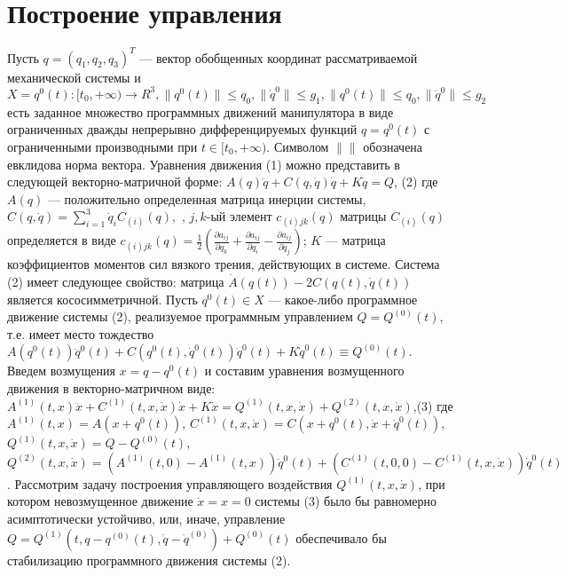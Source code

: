  \section{Построение управления}%
 \label{sec2.3}
 Пусть  $q = (q_1, q_2, q_3)^T$ --- вектор обобщенных координат рассматриваемой механической системы и $X = {q^0(t):[t_0, + \infty) \to R^3, \| q^0(t) \| \le q_0, \| \dot q^0 \| \le g_1,\| q^0(t) \| \le q_0, \| \ddot q^0 \| \le g_2}$ есть заданное множество программных движений манипулятора в виде ограниченных дважды непрерывно дифференцируемых функций $q = q^0(t)$ с ограниченными производными при $t \in [t_0, + \infty)$.  Символом   $\| \|$ обозначена евклидова норма вектора. Уравнения движения (1) можно представить в следующей векторно-матричной форме: $A(q) \ddot q + C(q, \dot q) \dot q + K \dot q = Q$,                                                 (2)
 где $A(q)$ --- положительно определенная матрица инерции системы, $C(q, \dot q) = \sum_{i = 1}^{3} \dot q_i C_{(i)} (q),$ , $j,k$-ый элемент $c_{(i)jk} (q)$ матрицы $C_{(i)}(q)$  определяется в виде $c_{(i)jk} (q) = \frac12 (\frac{\partial a_{ij}}{\partial q_k} + \frac{\partial a_{ij}}{\partial q_i} - \frac{\partial a_{ij}}{\partial q_j} )$;
 $K$ --- матрица коэффициентов моментов сил вязкого трения, действующих в системе.
 Система (2) имеет следующее свойство: матрица $\dot A(q(t)) - 2 C(q(t), \dot q(t))$  является  кососимметричной.
 Пусть $q^0(t) \in X$ --- какое-либо программное движение системы (2), реализуемое программным управлением $Q = Q^{(0)}(t)$, т.е. имеет место тождество $A(q^0(t)) \ddot q^0(t) + C(q^0(t), \dot q^0(t)) \dot q^0(t) + K \dot q^0(t) \equiv Q^{(0)}(t)$.
 Введем возмущения $x = q - q^0(t)$ и составим уравнения возмущенного движения в векторно-матричном виде:
 $A^{(1)}(t, x) \ddot x + C^{(1)}(t, x, \dot x) \dot x + K \dot x = Q^{(1)}(t, x, \dot x) + Q^{(2)}(t, x, \dot x)$,(3)
 где $A^{(1)}(t, x) = A(x + q^0(t))$, $C^{(1)}(t, x, \dot x) = C(x + q^0(t), \dot x + \dot q^0(t))$, $Q^{(1)}(t, x, \dot x) = Q - Q^{(0)}(t)$, $Q^{(2)}(t, x, \dot x) = (A^{(1)}(t, 0) - A^{(1)}(t, x)) \ddot q^0(t) + (C^{(1)}(t, 0, 0) - C^{(1)}(t, x, \dot x)) \dot q^0(t)$ .
 Рассмотрим задачу построения управляющего воздействия $Q^{(1)}(t, x, \dot x)$, при котором невозмущенное движение $\dot x = x = 0$ системы (3) было бы равномерно асимптотически устойчиво, или, иначе, управление $Q = Q^{(1)}(t, q-q^{(0)}(t), \dot q - \dot q^{(0)}) + Q^{(0)}(t)$ обеспечивало бы стабилизацию программного движения   системы (2).
 
